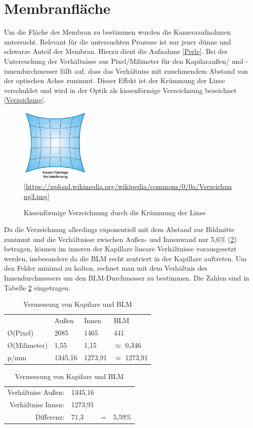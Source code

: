 \documentclass{include/thesisclass3}
\begin{document}
\section{Membranfläche}
Um die Fläche der Membran zu bestimmen wurden die Kameraaufnahmen untersucht. Relevant für die untersuchten Prozesse ist nur jener dünne und schwarze Anteil der Membran. Hierzu dient die Aufnahme \ref{Perle}. Bei der Untersuchung der Verhältnisse aus Pixel/Milimeter für den Kapilaraußen/ und -innendurchmesser fällt auf, dass das Verhältniss mit zunehmendem Abstand von der optischen Achse zunimmt. Dieser Effekt ist der Krümmung der Linse verschuldet und wird in der Optik als kissenförmige Verzeichnung bezeichnet \ref{Verzeichung}.
\begin{figure}[ht]
	\begin{center}
		\includegraphics[width=0.3\textwidth]{images/Verzeichnung.png}
		[\url{https://upload.wikimedia.org/wikipedia/commons/0/0a/Verzeichnung3.png}]
		\caption{Kissenförmige Verzeichnung durch die Krümmung der Linse}
		\label{Verzeichnung}
	\end{center}
\end{figure}
Da die Verzeichnung allerdings exponentiell mit dem Abstand zur Bildmitte zunimmt und die Verhältnisse zwischen Außen- und Innenwand nur 5,6\% (\ref{tab-ratio}) betragen, können im inneren der Kapillare lineare Verhältnisse vorausgesetzt werden, insbesondere da die BLM recht zentriert in der Kapillare auftreten.
Um den Fehler minimal zu halten, rechnet man mit dem Verhältnis des Innendurchmessers um den BLM-Durchmesser zu bestimmen. Die Zahlen sind in Tabelle \ref{tab-ratio} eingetragen.

\begin{table}[H]
	\centering
	\begin{tabular}{llll}
		& Au\ss en   & Innen     & BLM     \\
		\O  (Pixel) & 2085    & 1465    & 441     \\
		\O  (Milimeter)       & 1,55    & 1,15    & $\approx$ 0,346   \\
		p/mm            & 1345,16 & 1273,91 & $\approx$ 1273,91
	\end{tabular}
	\begin{tabular}{rll}
Verhältniss Außen: & 1345,16 & \\
Verhältniss Innen: & 1273,91 & \\
Differenz: & 71,3 & =~~5,59\%\\
\end{tabular}
	\caption{Vermessung von Kapilare und BLM}
	\label{tab-ratio}
\end{table}
\end{document}
